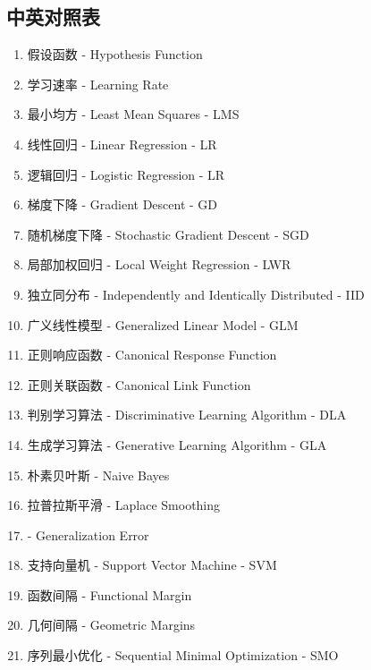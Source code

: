 \subsection{中英对照表}
\begin{enumerate}
	\item 假设函数 - Hypothesis Function
	\item 学习速率 - Learning Rate
	\item 最小均方 - Least Mean Squares - LMS
	\item 线性回归 - Linear Regression - LR
	\item 逻辑回归 - Logistic Regression - LR
	\item 梯度下降 - Gradient Descent - GD
	\item 随机梯度下降 - Stochastic Gradient Descent - SGD
	\item 局部加权回归 - Local Weight Regression - LWR
	\item 独立同分布 - Independently and Identically Distributed - IID
	\item 广义线性模型 - Generalized Linear Model - GLM
	\item 正则响应函数 - Canonical Response Function
	\item 正则关联函数 - Canonical Link Function
	\item 判别学习算法 - Discriminative Learning Algorithm - DLA
	\item 生成学习算法 - Generative Learning Algorithm - GLA
	\item 朴素贝叶斯 - Naive Bayes
	\item 拉普拉斯平滑 - Laplace Smoothing
	\item  - Generalization Error
	\item 支持向量机 - Support Vector Machine - SVM
	\item 函数间隔 - Functional Margin
	\item 几何间隔 - Geometric Margins
	\item 序列最小优化 - Sequential Minimal Optimization - SMO
\end{enumerate}